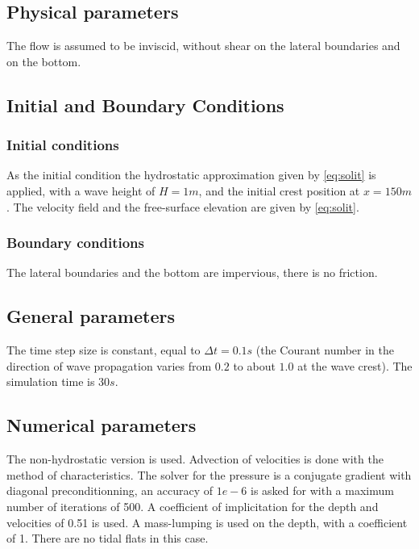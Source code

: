 \subsection{Physical parameters}
%
The flow is assumed to be inviscid, without shear on the lateral boundaries and on the bottom.
%
\subsection{Initial and Boundary Conditions}
%
\subsubsection{Initial conditions}
%
As the initial condition the hydrostatic approximation
given by \eqref{eq:solit} is applied, with a wave height of $H = 1 m$,
and the initial crest position at $x = 150 m$. The velocity field and the free-surface
elevation are given by \eqref{eq:solit}.
%
\subsubsection{Boundary conditions}
%
The lateral boundaries and the bottom are impervious, there is no friction.
%
\subsection{General parameters}
%
The time step size is constant, equal to $\Delta t = 0.1 s$ (the Courant number in the direction
of wave propagation varies from $0.2$ to about $1.0$ at the wave crest).
The simulation time is $30 s$.

\subsection{Numerical parameters}
%
The non-hydrostatic version is used. Advection of velocities is done with the method of characteristics.
The solver for the pressure is a conjugate gradient with diagonal preconditionning,
an accuracy of $1e-6$ is asked for with a maximum number of iterations of 500.
A coefficient of implicitation for the depth and velocities of 0.51 is used.
A mass-lumping is used on the depth, with a coefficient of 1.
There are no tidal flats in this case.
%
